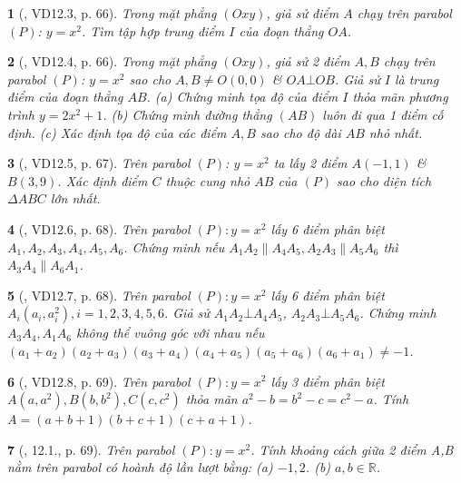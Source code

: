 \documentclass{article}
\newtheorem{baitoan}{}
\begin{document}
\begin{baitoan}[\cite{TLCT_THCS_Toan_9_dai_so}, VD12.3, p. 66]
	Trong mặt phẳng $(Oxy)$, giả sử điểm $A$ chạy trên parabol $(P)$: $y = x^2$. Tìm tập hợp trung điểm $I$ của đoạn thẳng $OA$.
\end{baitoan}

\begin{baitoan}[\cite{TLCT_THCS_Toan_9_dai_so}, VD12.4, p. 66]
	Trong mặt phẳng $(Oxy)$, giả sử 2 điểm $A,B$ chạy trên parabol $(P)$: $y = x^2$ sao cho $A,B\ne O(0,0)$ \& $OA\bot OB$. Giả sử $I$ là trung điểm của đoạn thẳng $AB$. (a) Chứng minh tọa độ của điểm $I$ thỏa mãn phương trình $y = 2x^2 + 1$. (b) Chứng minh đường thẳng $(AB)$ luôn đi qua 1 điểm cố định. (c) Xác định tọa độ của các điểm $A,B$ sao cho độ dài $AB$ nhỏ nhất.
\end{baitoan}

\begin{baitoan}[\cite{TLCT_THCS_Toan_9_dai_so}, VD12.5, p. 67]
	Trên parabol $(P)$: $y = x^2$ ta lấy 2 điểm $A(-1,1)$ \& $B(3,9)$. Xác định điểm $C$ thuộc cung nhỏ $AB$ của $(P)$ sao cho diện tích $\Delta ABC$ lớn nhất.
\end{baitoan}

\begin{baitoan}[\cite{TLCT_THCS_Toan_9_dai_so}, VD12.6, p. 68]
	Trên parabol $(P):y = x^2$ lấy 6 điểm phân biệt $A_1,A_2,A_3,A_4,A_5,A_6$. Chứng minh nếu $A_1A_2\parallel A_4A_5,A_2A_3\parallel A_5A_6$ thì $A_3A_4\parallel A_6A_1$.
\end{baitoan}

\begin{baitoan}[\cite{TLCT_THCS_Toan_9_dai_so}, VD12.7, p. 68]
	Trên parabol $(P):y = x^2$ lấy 6 điểm phân biệt $A_i(a_i,a_i^2),i = 1,2,3,4,5,6$. Giả sử $A_1A_2\bot A_4A_5$, $A_2A_3\bot A_5A_6$. Chứng minh $A_3A_4,A_1A_6$ không thể vuông góc với nhau nếu $(a_1 + a_2)(a_2 + a_3)(a_3 + a_4)(a_4 + a_5)(a_5 + a_6)(a_6 + a_1)\ne-1$.
\end{baitoan}

\begin{baitoan}[\cite{TLCT_THCS_Toan_9_dai_so}, VD12.8, p. 69]
	Trên parabol $(P):y = x^2$ lấy 3 điểm phân biệt $A(a,a^2),B(b,b^2),C(c,c^2)$ thỏa mãn $a^2 - b = b^2 - c = c^2 - a$. Tính $A =  (a + b + 1)(b + c + 1)(c + a + 1)$.
\end{baitoan}

\begin{baitoan}[\cite{TLCT_THCS_Toan_9_dai_so}, 12.1., p. 69]
	Trên parabol $(P):y = x^2$. Tính khoảng cách giữa 2 điểm A,B nằm trên parabol có hoành độ lần lượt bằng: (a) $-1,2$. (b) $a,b\in\mathbb{R}$.
\end{baitoan}
\end{document}
